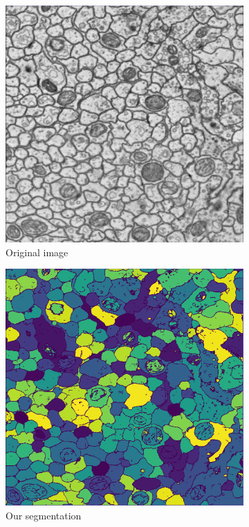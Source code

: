\begin{figure}[!htbp]
    \centering
    \begin{subfigure}[t]{0.31\textwidth}
        \centering
        \includegraphics[height=0.7\textwidth]{./images/cremi_orig_1.png}
        \caption{Original image}
    \end{subfigure}%
    \begin{subfigure}[t]{0.31\textwidth}
        \centering
        \includegraphics[height=0.7\textwidth]{./images/cremi_out_1.png}
        \caption{Our segmentation}
    \end{subfigure}%
    \begin{subfigure}[t]{0.31\textwidth}
        \centering

\end{subfigure}
\end{figure}
